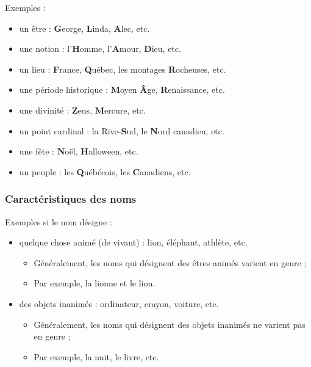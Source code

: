 \documentclass[10pt, french]{article}
\begin{document}
\begin{multicols*}{2}
\begin{definitionNOHFILLsub}
Exemples :
\begin{itemize}
	\item	un être : \textbf{G}eorge, \textbf{L}inda, \textbf{A}lec, etc.
	\item	une notion : l'\textbf{H}omme, l'\textbf{A}mour, \textbf{D}ieu, etc.
	\item	un lieu : \textbf{F}rance, \textbf{Q}uébec, les montages \textbf{R}ocheuses, etc.
	\item	une période historique : \textbf{M}oyen \textbf{Â}ge, \textbf{R}enaissance, etc.
	\item	une divinité : \textbf{Z}eus, \textbf{M}ercure, etc.
	\item	un point cardinal : la Rive-\textbf{S}ud, le \textbf{N}ord canadien, etc.
	\item	une fête : \textbf{N}oël, \textbf{H}alloween, etc.
	\item	un peuple : les \textbf{Q}uébécois, les \textbf{C}anadiens, etc.
\end{itemize}
\end{definitionNOHFILLsub}


\subsubsection*{Caractéristiques des noms}
\begin{definitionNOHFILLpropos}
Exemples si le nom désigne :
\begin{itemize}
	\item	quelque chose animé (de vivant) : lion, éléphant, athlète, etc.
		\begin{itemize}
		\item	Généralement, les noms qui désignent des êtres animés varient en genre ;
		\item	Par exemple, la lionne et le lion.
		\end{itemize}
	\item	des objets inanimés : ordinateur, crayon, voiture, etc.
		\begin{itemize}
		\item	Généralement, les noms qui désignent des objets inanimés ne varient pas en genre ;
		\item	Par exemple, la nuit, le livre, etc.
		\end{itemize}
\end{itemize}
\end{definitionNOHFILLpropos}



\end{multicols*}
\end{document}

